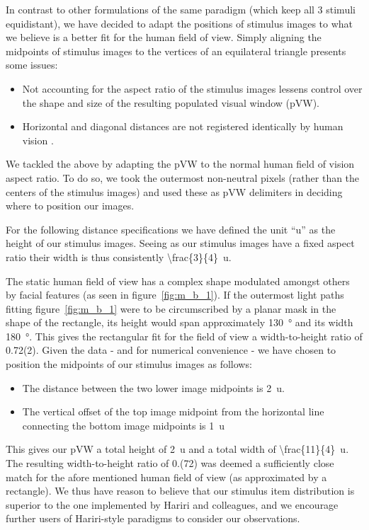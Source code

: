 	    In contrast to other formulations\citep{Hariri2000,Hariri2003} of the same paradigm (which keep all 3 stimuli equidistant),
	    we have decided to adapt the positions of stimulus images to what we believe is a better fit for the human field of view.
	    Simply aligning the midpoints of stimulus images to the vertices of an equilateral triangle presents some issues:
	    \begin{itemize}
		\item Not accounting for the aspect ratio of the stimulus images lessens control over the shape and size of the resulting populated visual window (pVW).
		\item Horizontal and diagonal distances are not registered identically by human vision \citep{TerryBahill1975}.
	    \end{itemize}
	    
	    We tackled the above by adapting the pVW to the normal human field of vision aspect ratio.
	    To do so, we took the outermost non-neutral pixels (rather than the centers of the stimulus images) and used these as pVW delimiters in deciding where to position our images.
	    
	    For the following distance specifications we have defined the unit “u” as the height of our stimulus images.
	    Seeing as our stimulus images have a fixed aspect ratio their width is thus consistently \SI[parse-numbers = false]{\frac{3}{4}}{u}.
	    
	    The static human field of view has a complex shape modulated amongst others by facial features (as seen in figure~\ref{fig:m_b_1}).
	    If the outermost light paths fitting figure~\ref{fig:m_b_1} were to be circumscribed by a planar mask in the shape of the rectangle, its height would span approximately \SI{130}{\degree} and its width \SI{180}{\degree}.
	    This gives the rectangular fit for the field of view a width-to-height ratio of 0.72(2).
	    Given the data - and for numerical convenience - we have chosen to position the midpoints of our stimulus images as follows:
	    \begin{itemize}
		\item The distance between the two lower image midpoints is \SI{2}{u}.
		\item The vertical offset of the top image midpoint from the horizontal line connecting the bottom image midpoints is \SI{1}{u}
	    \end{itemize}
	    This gives our pVW a total height of \SI{2}{u} and a total width of \SI[parse-numbers = false]{\frac{11}{4}}{u}.
	    The resulting width-to-height ratio of 0.(72) was deemed a sufficiently close match for the afore mentioned human field of view (as approximated by a rectangle).
	    We thus have reason to believe that our stimulus item distribution is superior to the one implemented by Hariri and colleagues, and we encourage further users of Hariri-style paradigms to consider our observations.  
	    

